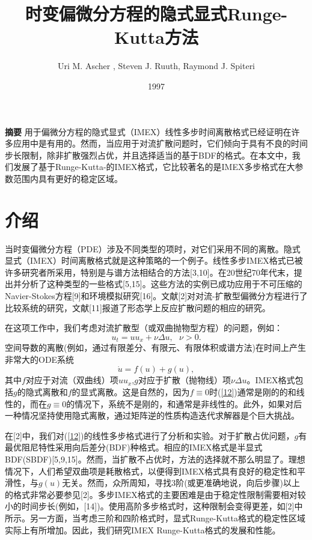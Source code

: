 \documentclass[12pt,a4paper]{article}
\numberwithin{equation}{section}
\begin{document}
\title{时变偏微分方程的隐式显式Runge-Kutta方法}
\author{Uri M. Ascher , Steven J. Ruuth, Raymond J. Spiteri}
\date{1997}
\maketitle

\textbf{摘要}
用于偏微分方程的隐式显式（IMEX）线性多步时间离散格式已经证明在许多应用中是有用的。然而，当应用于对流扩散问题时，它们倾向于具有不良的时间步长限制，除非扩散强烈占优，并且选择适当的基于BDF的格式。在本文中，我们发展了基于Runge-Kutta-的IMEX格式，它比较著名的是IMEX多步格式在大参数范围内具有更好的稳定区域。

\section{介绍}
当时变偏微分方程（PDE）涉及不同类型的项时，对它们采用不同的离散。隐式显式（IMEX）时间离散格式就是这种策略的一个例子。线性多步IMEX格式已被许多研究者所采用，特别是与谱方法相结合的方法[3,10]。在20世纪70年代末，提出并分析了这种类型的一些格式[5,15]。这些方法的实例已成功应用于不可压缩的Navier-Stokes方程[9]和环境模拟研究[16]。文献[2]对对流-扩散型偏微分方程进行了比较系统的研究，文献[11]报道了形态学上反应扩散问题的相应的研究。

在这项工作中，我们考虑对流扩散型（或双曲抛物型方程）的问题，例如：
\begin{equation}\label{11}
u_{t}=uu_{x}+\nu\Delta u,~~~\nu >0.
\end{equation}
空间导数的离散(例如，通过有限差分、有限元、有限体积或谱方法)在时间上产生非常大的ODE系统
\begin{equation}\label{12}
\dot{u}=f(u)+g(u),
\end{equation}
其中$f$对应于对流（双曲线）项$uu_{x}$,$g$对应于扩散（抛物线）项$\nu\Delta u$。IMEX格式包括$g$的隐式离散和$f$的显式离散。这是自然的，因为$f\equiv 0$时(\ref{12})通常是刚的的和线性的，而在$g\equiv 0$的情况下，系统不是刚的，和通常是非线性的。此外，如果对后一种情况坚持使用隐式离散，通过矩阵逆的性质构造迭代求解器是个巨大挑战。

在[2]中，我们对(\ref{12})的线性多步格式进行了分析和实验。对于扩散占优问题，$g$有最优阻尼特性采用向后差分(BDF)种格式。相应的IMEX格式是半显式BDF(SBDF)[5,9,15]。然而，当扩散不占优时，方法的选择就不那么明显了。理想情况下，人们希望双曲项是耗散格式，以便得到IMEX格式具有良好的稳定性和平滑性，与$g(u)$无关。然而，众所周知，寻找3阶(或更准确地说，向后步骤)以上的格式非常必要参见[2]。多步IMEX格式的主要困难是由于稳定性限制需要相对较小的时间步长(例如，[14])。使用高阶多步格式时，这种限制会变得更差，如[2]中所示。另一方面，当考虑三阶和四阶格式时，显式Runge-Kutta格式的稳定性区域实际上有所增加。因此，我们研究IMEX Runge-Kutta格式的发展和性能。
\end{document}
